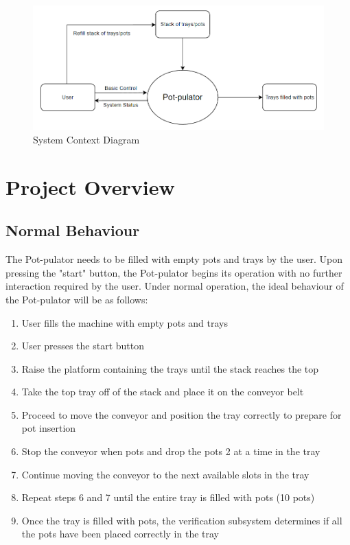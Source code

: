 \documentclass[12pt, titlepage]{article}
\begin{document}
\begin{figure}[H]
  \includegraphics[width=\linewidth]{scope.PNG}
  \caption{System Context Diagram}
  \label{fig:scope}
\end{figure}

\section{Project Overview}

\subsection{Normal Behaviour}

The Pot-pulator needs to be filled with empty pots and trays by the user. Upon pressing the "start" button,
the Pot-pulator begins its operation with no further interaction required by the user.
Under normal operation, the ideal behaviour of the Pot-pulator will be as follows:
\begin{enumerate}
  \item User fills the machine with empty pots and trays
  \item User presses the start button
  \item Raise the platform containing the trays until the stack reaches the top
  \item Take the top tray off of the stack and place it on the conveyor belt
  \item Proceed to move the conveyor and position the tray correctly to prepare for pot insertion
  \item Stop the conveyor when pots and drop the pots 2 at a time in the tray
  \item Continue moving the conveyor to the next available slots in the tray
  \item Repeat steps 6 and 7 until the entire tray is filled with pots (10 pots)
  \item Once the tray is filled with pots, the verification subsystem determines if all the pots have been placed correctly in the tray
\end{enumerate}
\end{document}

